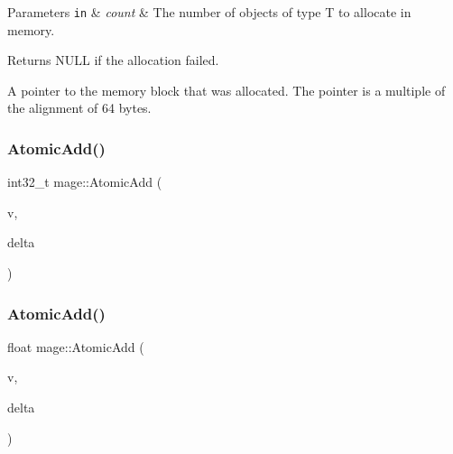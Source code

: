 \begin{DoxyParams}[1]{Parameters}
\mbox{\tt in}  & {\em count} & The number of objects of type {\ttfamily T} to allocate in memory. \\
\hline
\end{DoxyParams}
\begin{DoxyReturn}{Returns}
{\ttfamily N\+U\+LL} if the allocation failed. 

A pointer to the memory block that was allocated. The pointer is a multiple of the alignment of 64 bytes. 
\end{DoxyReturn}
\hypertarget{namespacemage_a56e179559b923b1997495c1bc8e3778e}{}\label{namespacemage_a56e179559b923b1997495c1bc8e3778e} 
\subsubsection{\texorpdfstring{Atomic\+Add()}{AtomicAdd()}\hspace{0.1cm}{\footnotesize\ttfamily [1/2]}}
{\footnotesize\ttfamily int32\+\_\+t mage\+::\+Atomic\+Add (\begin{DoxyParamCaption}\item[{Atomic\+Int32 $\ast$}]{v,  }\item[{int32\+\_\+t}]{delta }\end{DoxyParamCaption})}

\hypertarget{namespacemage_a7c863b965835307770946964a76098ce}{}\label{namespacemage_a7c863b965835307770946964a76098ce} 
\subsubsection{\texorpdfstring{Atomic\+Add()}{AtomicAdd()}\hspace{0.1cm}{\footnotesize\ttfamily [2/2]}}
{\footnotesize\ttfamily float mage\+::\+Atomic\+Add (\begin{DoxyParamCaption}\item[{volatile float $\ast$}]{v,  }\item[{float}]{delta }\end{DoxyParamCaption})}

\hypertarget{namespacemage_a299b0e2de7b6225ad86eab118bca4627}{}\label{namespacemage_a299b0e2de7b6225ad86eab118bca4627} 
